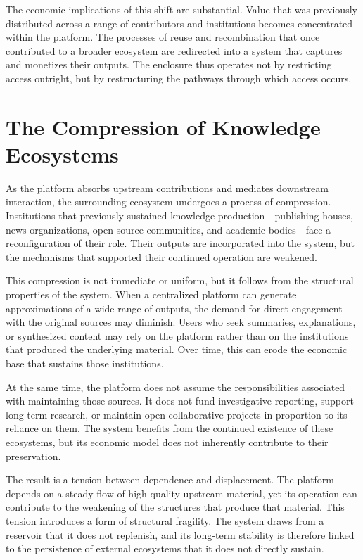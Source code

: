 \documentclass[12pt, oneside]{article}
\begin{document}
The economic implications of this shift are substantial. Value that was previously distributed across a range of contributors and institutions becomes concentrated within the platform. The processes of reuse and recombination that once contributed to a broader ecosystem are redirected into a system that captures and monetizes their outputs. The enclosure thus operates not by restricting access outright, but by restructuring the pathways through which access occurs.

\section{The Compression of Knowledge Ecosystems}

As the platform absorbs upstream contributions and mediates downstream interaction, the surrounding ecosystem undergoes a process of compression. Institutions that previously sustained knowledge production---publishing houses, news organizations, open-source communities, and academic bodies---face a reconfiguration of their role. Their outputs are incorporated into the system, but the mechanisms that supported their continued operation are weakened.

This compression is not immediate or uniform, but it follows from the structural properties of the system. When a centralized platform can generate approximations of a wide range of outputs, the demand for direct engagement with the original sources may diminish. Users who seek summaries, explanations, or synthesized content may rely on the platform rather than on the institutions that produced the underlying material. Over time, this can erode the economic base that sustains those institutions.

At the same time, the platform does not assume the responsibilities associated with maintaining those sources. It does not fund investigative reporting, support long-term research, or maintain open collaborative projects in proportion to its reliance on them. The system benefits from the continued existence of these ecosystems, but its economic model does not inherently contribute to their preservation.

The result is a tension between dependence and displacement. The platform depends on a steady flow of high-quality upstream material, yet its operation can contribute to the weakening of the structures that produce that material. This tension introduces a form of structural fragility. The system draws from a reservoir that it does not replenish, and its long-term stability is therefore linked to the persistence of external ecosystems that it does not directly sustain.
\end{document}

